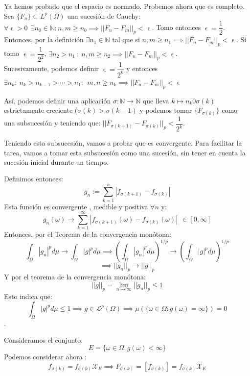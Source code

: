 \documentclass[11pt, a4paper]{article}
\makeatletter
\newif\IfInSansMode
\let\oldsf\sffamily
\renewcommand*{\sffamily}{\oldsf\mathversion{sans}\InSansModetrue}
\let\oldnorm\normalfont
\renewcommand*{\normalfont}{\oldnorm\InSansModefalse\mathversion{normal}}
\let\epsilon\upvarepsilon
\renewenvironment{proof}[1][\proofname] {\par\pushQED{\qed}\normalfont\topsep6\p@\@plus6\p@\relax\trivlist\item[\hskip\labelsep\itshape\sffamily#1\@addpunct{.}]\ignorespaces}{\popQED\endtrivlist\@endpefalse}
\theoremstyle{theorem-style}
\theoremstyle{definition-style}
\theoremstyle{remark-style}
\theoremstyle{example-style}
\makeatother
\begin{document}
\begin{proof}
  Ya hemos probado que el espacio es normado. Probemos ahora que es completo.\\
  
  Sea $\{ F_n\} \subset L^p(\Omega)$ una sucesión de Cauchy: $\forall \epsilon > 0 \ \ \exists n_0 \in \mathbb N : n,m \geq n_0 \implies || F_n - F_m ||_p < \epsilon$.
  Tomo entonces $\epsilon = \dfrac{1}{2}$. Entonces, por la definición $\exists n_1 \in \mathbb N$ tal que si $n,m \geq n_1 \implies || F_n - F_m ||_p < \epsilon $.
  Si tomo $\epsilon = \dfrac{1}{2^2}$, $\exists n_2 > n_1 \ : \ n,m \geq n_2 \implies || F_n - F_m ||_p < \epsilon$.\\
  Sucesivamente, podemos definir $\epsilon= \dfrac{1}{2^k}$ y entonces $\exists n_k : \ n_k > n_{k-1} > \cdots > n_1 : \ \ m,n \geq n_k \implies || F_n - F_m ||_p < \epsilon$
  
  Así, podemos definir una aplicación $\sigma: \mathbb N \to \mathbb N$ que lleva $k \mapsto n_k 0 \sigma(k)$ estrictamente creciente ($\sigma(k) > \sigma(k-1)$ y podemos tomar $\{F_{\sigma(k)}\}$ como una subsucesión y teniendo que: $|| F_{\sigma(k+1)} - F_{\sigma(k)} ||_p < \dfrac{1}{2^k}$.
  
  Teniendo esta subsucesión, vamos a probar que es convergente. Para facilitar la tarea, vamos a tomar esta subsucesión como una sucesión, sin tener en cuenta la sucesión inicial durante un tiempo.
  
  Definimos entonces:
  \[
    g_n := \sum_{k=1}^n |f_{\sigma(k+1)} - f_{\sigma(k)}|
  \]
  Esta función es convergente , medible y positiva $\forall n$ y:
  \[
    g_n(\omega) \to \sum_{k=1}^\infty |f_{\sigma(k+1)}(\omega) - f_{\sigma(k)}(\omega)| \ \ \in [0,\infty]
  \]
  Entonces, por el Teorema de la convergencia monótona:
  \[
    \int_\Omega |g_n|^p d\mu \to \int_\Omega |g|^p d\mu \implies (\int_\Omega |g_n|^p d\mu)^{1/p} \to (\int_\Omega |g|^p d\mu)^{1/p} 
  \]
  \[
    \implies ||g_n||_p \to ||g||_p
  \]
  Y por el teorema de la convergencia monótona:
  \[
    ||g||_p = \lim_{n\to \infty} ||g_n||_p \leq 1  
  \]
  Esto indica que:
  \[
    \int_\Omega |g|^p d\mu \leq 1 \implies g \in \mathcal L ^p(\Omega) \implies \mu(\{ \omega \in \Omega : g(\omega) = \infty\}) = 0
  \].
  
  Consideramos el conjunto:
  \[
    E = \{ \omega \in \Omega : g(\omega) < \infty\}
  \]	
  Podemos considerar ahora :
  \[
    f_{\sigma(k)} = f_{\sigma(k)} \mathcal X _E \implies F_{\sigma(k)} = [f_{\sigma(k)}] = f_{\sigma(k)} \mathcal X _E
  \]
  

\end{proof}
\end{document}
